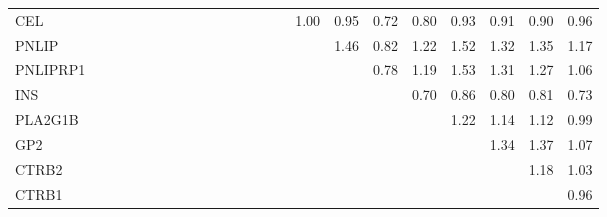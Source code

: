\begin{longtable}{lrrrrrrrrrrrrrrrrrrrrrr}
CEL      &              &              &              &              &             &             &             &            &              &            &            &            &             &           &        1.00 &           0.95 &      0.72 &          0.80 &      0.93 &        0.91 &        0.90 &       0.96 \\
PNLIP    &              &              &              &              &             &             &             &            &              &            &            &            &             &           &             &           1.46 &      0.82 &          1.22 &      1.52 &        1.32 &        1.35 &       1.17 \\
PNLIPRP1 &              &              &              &              &             &             &             &            &              &            &            &            &             &           &             &                &      0.78 &          1.19 &      1.53 &        1.31 &        1.27 &       1.06 \\
INS      &              &              &              &              &             &             &             &            &              &            &            &            &             &           &             &                &           &          0.70 &      0.86 &        0.80 &        0.81 &       0.73 \\
PLA2G1B  &              &              &              &              &             &             &             &            &              &            &            &            &             &           &             &                &           &               &      1.22 &        1.14 &        1.12 &       0.99 \\
GP2      &              &              &              &              &             &             &             &            &              &            &            &            &             &           &             &                &           &               &           &        1.34 &        1.37 &       1.07 \\
CTRB2    &              &              &              &              &             &             &             &            &              &            &            &            &             &           &             &                &           &               &           &             &        1.18 &       1.03 \\
CTRB1    &              &              &              &              &             &             &             &            &              &            &            &            &             &           &             &                &           &               &           &             &             &       0.96 \\
\end{longtable}


